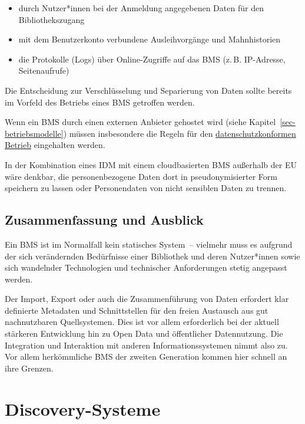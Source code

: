 \documentclass[
  11pt,
  letterpaper,
  DIV=11,
  twoside]{scrreprt}
\begin{document}
\begin{itemize}
\item
  durch Nutzer*innen bei der Anmeldung angegebenen Daten für den
  Bibliothekszugang
\item
  mit dem Benutzerkonto verbundene Ausleihvorgänge und Mahnhistorien
\item
  die Protokolle (Logs) über Online-Zugriffe auf das BMS (z.\,B.
  IP-Adresse, Seitenaufrufe)
\end{itemize}

Die Entscheidung zur Verschlüsselung und Separierung von Daten sollte
bereits im Vorfeld des Betriebs eines BMS getroffen werden.

Wenn ein BMS durch einen externen Anbieter gehostet wird (siehe
Kapitel~\ref{sec-betriebsmodelle}) müssen insbesondere die Regeln für
den \hyperref[datenschutz]{datenschutzkonformen Betrieb} eingehalten
werden.

In der Kombination eines IDM mit einem cloudbasierten BMS außerhalb der
EU wäre denkbar, die personenbezogene Daten dort in pseudonymisierter
Form speichern zu lassen oder Personendaten von nicht sensiblen Daten zu
trennen.

\section{Zusammenfassung und
Ausblick}\label{zusammenfassung-und-ausblick-3}

Ein BMS ist im Normalfall kein statisches System~-- vielmehr muss es
aufgrund der sich verändernden Bedürfnisse einer Bibliothek und deren
Nutzer*innen sowie sich wandelnder Technologien und technischer
Anforderungen stetig angepasst werden.

Der Import, Export oder auch die Zusammenführung von Daten erfordert
klar definierte Metadaten und Schnittstellen für den freien Austausch
aus gut nachnutzbaren Quellsystemen. Dies ist vor allem erforderlich bei
der aktuell stärkeren Entwicklung hin zu Open Data und öffentlicher
Datennutzung. Die Integration und Interaktion mit anderen
Informationssystemen nimmt also zu. Vor allem herkömmliche BMS der
zweiten Generation kommen hier schnell an ihre Grenzen.


\chapter{Discovery-Systeme}\label{sec-discovery}
\end{document}
